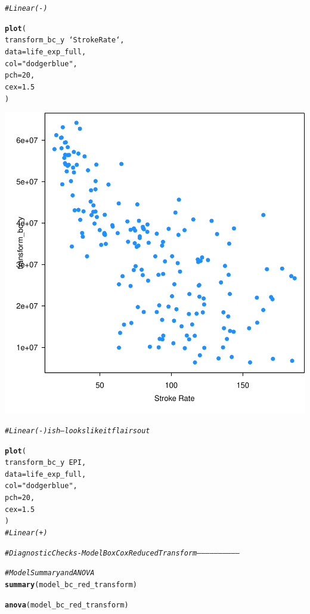 \documentclass{article}\usepackage[]{graphicx}\usepackage[]{color}
\makeatletter
\newcommand{\hlnum}[1]{\textcolor[rgb]{0.686,0.059,0.569}{#1}}%
\newcommand{\hlstr}[1]{\textcolor[rgb]{0.192,0.494,0.8}{#1}}%
\newcommand{\hlcom}[1]{\textcolor[rgb]{0.678,0.584,0.686}{\textit{#1}}}%
\newcommand{\hlopt}[1]{\textcolor[rgb]{0,0,0}{#1}}%
\newcommand{\hlstd}[1]{\textcolor[rgb]{0.345,0.345,0.345}{#1}}%
\newcommand{\hlkwc}[1]{\textcolor[rgb]{0.333,0.667,0.333}{#1}}%
\newcommand{\hlkwd}[1]{\textcolor[rgb]{0.737,0.353,0.396}{\textbf{#1}}}%
\newenvironment{kframe}{%
 \def\at@end@of@kframe{}%
 \ifinner\ifhmode%
  \def\at@end@of@kframe{\end{minipage}}%
  \begin{minipage}{\columnwidth}%
 \fi\fi%
 \def\FrameCommand##1{\hskip\@totalleftmargin \hskip-\fboxsep
 \colorbox{shadecolor}{##1}\hskip-\fboxsep
     \hskip-\linewidth \hskip-\@totalleftmargin \hskip\columnwidth}%
 \MakeFramed {\advance\hsize-\width
   \@totalleftmargin\z@ \linewidth\hsize
   \@setminipage}}%
 {\par\unskip\endMakeFramed%
 \at@end@of@kframe}
\newenvironment{knitrout}{}{} %
\makeatother
\begin{document}
\begin{knitrout}
\begin{kframe}\begin{alltt}
\hlcom{# Linear (-)}

\hlkwd{plot}\hlstd{(}
  \hlstd{transform_bc_y} \hlopt{~} \hlstd{`Stroke Rate`,}
  \hlkwc{data} \hlstd{= life_exp_full,}
  \hlkwc{col} \hlstd{=} \hlstr{"dodgerblue"}\hlstd{,}
  \hlkwc{pch} \hlstd{=} \hlnum{20}\hlstd{,}
  \hlkwc{cex} \hlstd{=} \hlnum{1.5}
\hlstd{)}
\end{alltt}
\end{kframe}

{\centering \includegraphics[width=.6\linewidth]{figure/Analysis-Rnwauto-report-33} 

}


\begin{kframe}\begin{alltt}
\hlcom{# Linear (-) ish --- looks like it flairs out}

\hlkwd{plot}\hlstd{(}
  \hlstd{transform_bc_y} \hlopt{~} \hlstd{EPI,}
  \hlkwc{data} \hlstd{= life_exp_full,}
  \hlkwc{col} \hlstd{=} \hlstr{"dodgerblue"}\hlstd{,}
  \hlkwc{pch} \hlstd{=} \hlnum{20}\hlstd{,}
  \hlkwc{cex} \hlstd{=} \hlnum{1.5}
\hlstd{)}
\hlcom{# Linear (+)}

\hlcom{# Diagnostic Checks - Model Box Cox Reduced Transform -----------------------------}

\hlcom{# Model Summary and ANOVA}
\hlkwd{summary}\hlstd{(model_bc_red_transform)}
\end{alltt}


{\ttfamily\noindent\bfseries\color{errorcolor}{\#\# Error in summary(model\_bc\_red\_transform): object 'model\_bc\_red\_transform' not found}}\begin{alltt}
\hlkwd{anova}\hlstd{(model_bc_red_transform)}
\end{alltt}



\end{kframe}
\end{knitrout}
\end{document}
